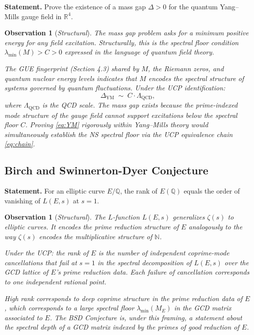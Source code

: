\documentclass[12pt]{article}
\newtheorem{observation}[theorem]{Observation}
\begin{document}
\textbf{Statement.} Prove the existence of a mass gap
$\Delta > 0$ for the quantum Yang--Mills gauge field
in $\mathbb{R}^4$.

\begin{observation}[\emph{Structural}]
\label{obs:YM}
The mass gap problem asks for a minimum positive energy
for any field excitation. Structurally, this is the spectral
floor condition $\lambda_{\min}(M) > C > 0$ expressed in the
language of quantum field theory.

The GUE fingerprint (Section 4.3) shared by $M$, the
Riemann zeros, and quantum nuclear energy levels indicates
that $M$ encodes the spectral structure of systems governed
by quantum fluctuations. Under the UCP identification:
\begin{equation}
\Delta_{\mathrm{YM}} \;\sim\; C \cdot \Lambda_{\mathrm{QCD}},
\label{eq:YM}
\end{equation}
where $\Lambda_{\mathrm{QCD}}$ is the QCD scale.
The mass gap exists because the prime-indexed mode structure
of the gauge field cannot support excitations below the
spectral floor $C$. Proving \eqref{eq:YM} rigorously within
Yang--Mills theory would simultaneously establish the NS
spectral floor via the UCP equivalence chain \eqref{eq:chain}.
\end{observation}

\subsection{Birch and Swinnerton-Dyer Conjecture}

\textbf{Statement.} For an elliptic curve $E/\mathbb{Q}$,
the rank of $E(\mathbb{Q})$ equals the order of vanishing
of $L(E,s)$ at $s = 1$.

\begin{observation}[\emph{Structural}]
\label{obs:BSD}
The $L$-function $L(E,s)$ generalizes $\zeta(s)$ to elliptic
curves. It encodes the prime reduction structure of $E$
analogously to the way $\zeta(s)$ encodes the multiplicative
structure of $\mathbb{N}$.

Under the UCP: the rank of $E$ is the number of independent
coprime-mode cancellations that fail at $s = 1$ in the
spectral decomposition of $L(E,s)$ over the GCD lattice of
$E$'s prime reduction data. Each failure of cancellation
corresponds to one independent rational point.

High rank corresponds to deep coprime structure in the
prime reduction data of $E$, which corresponds to a large
spectral floor $\lambda_{\min}(M_E)$ in the GCD matrix
associated to $E$. The BSD Conjecture is, under this framing,
a statement about the spectral depth of a GCD matrix indexed
by the primes of good reduction of $E$.
\end{observation}
\end{document}
